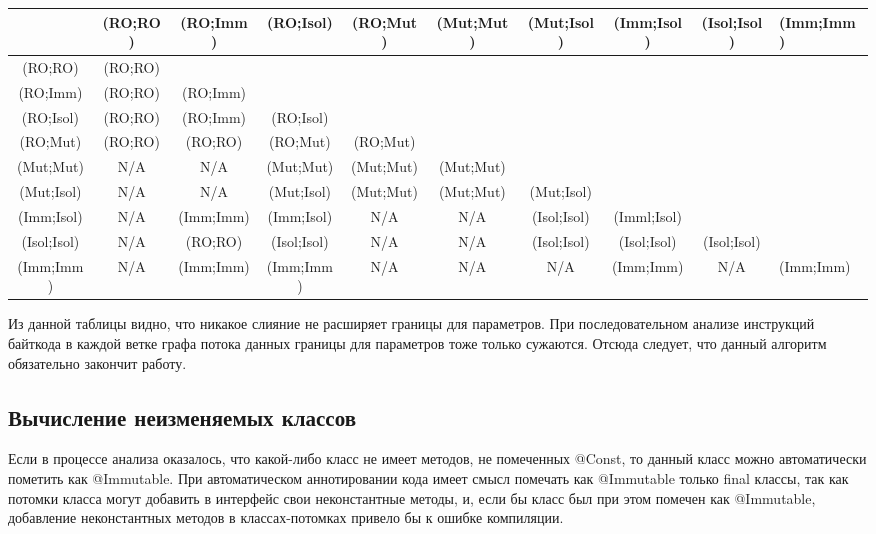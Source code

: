 {\tiny

	\begin{tabular}{ c | c | c | c | c | c | c | c | c }
	\hline			  &(RO;RO)&(RO;Imm) &(RO;Isol)  &(RO;Mut) &(Mut;Mut) &(Mut;Isol) &(Imm;Isol) &(Isol;Isol) &(Imm;Imm)\\
	\hline(RO;RO)    &(RO;RO)&          &		    &          &           &            &            &             &          \\
	\hline(RO;Imm)   &(RO;RO)&(RO;Imm) &            &          &           &            &            &             &          \\
	\hline(RO;Isol)  &(RO;RO)&(RO;Imm) &(RO;Isol)  &          &           &            &            &             &          \\
	\hline(RO;Mut)   &(RO;RO)&(RO;RO)  &(RO;Mut)   &(RO;Mut) &           &            &            &             &          \\
	\hline(Mut;Mut)  &N/A     &N/A       &(Mut;Mut)  &(Mut;Mut)&(Mut;Mut) &            &            &             &          \\
	\hline(Mut;Isol) &N/A     &N/A       &(Mut;Isol) &(Mut;Mut)&(Mut;Mut) &(Mut;Isol) &            &             &          \\
	\hline(Imm;Isol) &N/A     &(Imm;Imm)&(Imm;Isol) &N/A       &N/A        &(Isol;Isol)&(Imml;Isol)&             &          \\
	\hline(Isol;Isol)&N/A     &(RO;RO)  &(Isol;Isol)&N/A       &N/A        &(Isol;Isol)&(Isol;Isol)&(Isol;Isol) &          \\
	\hline(Imm;Imm)  &N/A     &(Imm;Imm)&(Imm;Imm)  &N/A       &N/A        &N/A         &(Imm;Imm)  &N/A          &(Imm;Imm)\\    
    \end{tabular}

}
Из данной таблицы видно, что никакое слияние не расширяет границы для параметров. При последовательном анализе инструкций байткода в каждой ветке графа потока данных границы для параметров тоже только сужаются. Отсюда следует, что данный алгоритм обязательно закончит работу.

\subsection{Вычисление неизменяемых классов}

Если в процессе анализа оказалось, что какой-либо класс не имеет методов, не помеченных @Const, то данный класс можно автоматически пометить как @Immutable. При автоматическом аннотировании кода имеет смысл помечать как @Immutable только final классы, так как потомки класса могут добавить в интерфейс свои неконстантные методы, и, если бы класс был при этом помечен как @Immutable, добавление неконстантных методов в классах-потомках привело бы к ошибке компиляции.

